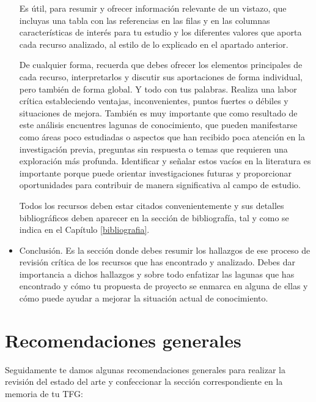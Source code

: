 \begin{itemize}
    Es útil, para resumir y ofrecer información relevante de un vistazo, que incluyas una tabla con las referencias en las filas y en las columnas características de interés para tu estudio y los diferentes valores que aporta cada recurso analizado, al estilo de lo explicado en el apartado anterior.

    De cualquier forma, recuerda que debes ofrecer los elementos principales de cada recurso, interpretarlos y discutir sus aportaciones de forma individual, pero también de forma global. Y todo con tus palabras. Realiza una labor crítica estableciendo ventajas, inconvenientes, puntos fuertes o débiles y situaciones de mejora. También es muy importante que como resultado de este análisis encuentres lagunas de conocimiento, que pueden manifestarse como áreas poco estudiadas o aspectos que han recibido poca atención en la investigación previa, preguntas sin respuesta o temas que requieren una exploración más profunda. Identificar y señalar estos vacíos en la literatura es importante porque puede orientar investigaciones futuras y proporcionar oportunidades para contribuir de manera significativa al campo de estudio.

    Todos los recursos deben estar citados convenientemente y sus detalles bibliográficos deben aparecer en la sección de bibliografía, tal y como se indica en el Capítulo \ref{bibliografia}.

    \item Conclusión. Es la sección donde debes resumir los hallazgos de ese proceso de revisión crítica de los recursos que has encontrado y analizado. Debes dar importancia a dichos hallazgos y sobre todo enfatizar las lagunas que has encontrado y cómo tu propuesta de proyecto se enmarca en alguna de ellas y cómo puede ayudar a mejorar la situación actual de conocimiento.
\end{itemize}

\section{Recomendaciones generales}

Seguidamente te damos algunas recomendaciones generales para realizar la revisión del estado del arte y confeccionar la sección correspondiente en la memoria de tu TFG:

